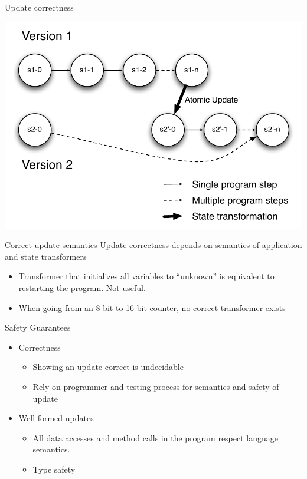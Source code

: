 

\begin{frame}{Update correctness}%
\begin{center}
\includegraphics[scale=0.71]{images/gupta-state-graph}
\end{center}
\end{frame}

\begin{frame}{Correct update semantics}%
Update correctness depends on semantics of application and state
transformers
\begin{itemize}
\item Transformer that initializes all variables to ``unknown'' is
      equivalent to restarting the program. Not useful.
\item When going from an 8-bit to 16-bit counter, no correct transformer
      exists
\end{itemize}
\end{frame}

\begin{frame}{Safety Guarantees}%
\begin{itemize}
\item Correctness
  \begin{itemize}
  \item Showing an update correct is undecidable
  \item Rely on programmer and testing process for semantics and safety of
        update
  \end{itemize}
\item Well-formed updates
  \begin{itemize}
  \item All data accesses and method calls in the program respect language
        semantics.
  \item Type safety
  \end{itemize}
\end{itemize}
\end{frame}
